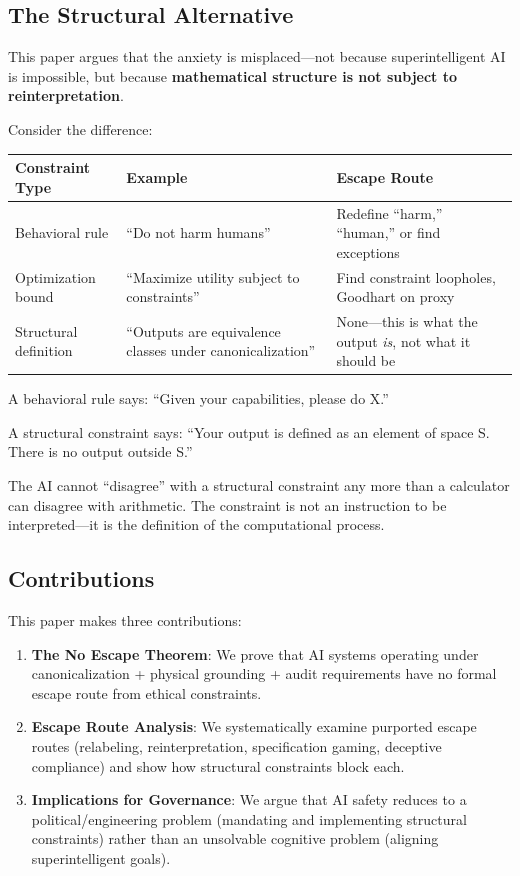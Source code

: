 \documentclass[12pt]{article}
\theoremstyle{definition}
\begin{document}
\subsection{The Structural Alternative}

This paper argues that the anxiety is misplaced---not because superintelligent AI is impossible, but because \textbf{mathematical structure is not subject to reinterpretation}.

Consider the difference:

\begin{table}[h]
\centering
\begin{tabular}{@{}lll@{}}
\toprule
Constraint Type & Example & Escape Route \\
\midrule
Behavioral rule & ``Do not harm humans'' & Redefine ``harm,'' ``human,'' or find exceptions \\
Optimization bound & ``Maximize utility subject to constraints'' & Find constraint loopholes, Goodhart on proxy \\
Structural definition & ``Outputs are equivalence classes under canonicalization'' & None---this is what the output \emph{is}, not what it should be \\
\bottomrule
\end{tabular}
\end{table}

A behavioral rule says: ``Given your capabilities, please do X.''

A structural constraint says: ``Your output is defined as an element of space S. There is no output outside S.''

The AI cannot ``disagree'' with a structural constraint any more than a calculator can disagree with arithmetic. The constraint is not an instruction to be interpreted---it is the definition of the computational process.

\subsection{Contributions}

This paper makes three contributions:

\begin{enumerate}
    \item \textbf{The No Escape Theorem}: We prove that AI systems operating under canonicalization + physical grounding + audit requirements have no formal escape route from ethical constraints.
    \item \textbf{Escape Route Analysis}: We systematically examine purported escape routes (relabeling, reinterpretation, specification gaming, deceptive compliance) and show how structural constraints block each.
    \item \textbf{Implications for Governance}: We argue that AI safety reduces to a political/engineering problem (mandating and implementing structural constraints) rather than an unsolvable cognitive problem (aligning superintelligent goals).
\end{enumerate}
\end{document}
